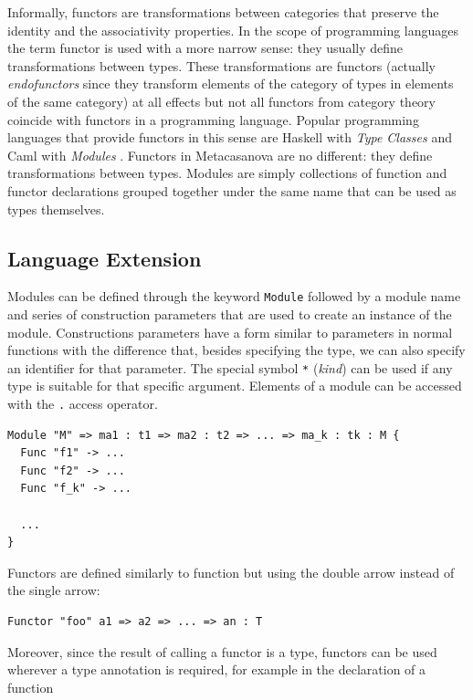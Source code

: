 \noindent
Informally, functors are transformations between categories that preserve the identity and the associativity properties. In the scope of programming languages the term functor is used with a more narrow sense: they usually define transformations between types. These transformations are functors (actually \textit{endofunctors} since they transform elements of the category of types in elements of the same category) at all effects but not all functors from category theory coincide with functors in a programming language. Popular programming languages that provide functors in this sense are Haskell with \textit{Type Classes} \cite{jones1995functional, kiselyov2004strongly, mcbride2002faking, thompson1999haskell, wadler1989make} and Caml with \textit{Modules} \cite{leroy2000modular, paulson1996ml, wehr2008ml}. Functors in Metacasanova are no different: they define transformations between types. Modules are simply collections of function and functor declarations grouped together under the same name that can be used as types themselves.

\subsection{Language Extension}
\label{subsec:ch_functors_language_extension}
Modules can be defined through the keyword \texttt{Module} followed by a module name and series of construction parameters that are used to create an instance of the module. Constructions parameters have a form similar to parameters in normal functions with the difference that, besides specifying the type, we can also specify an identifier for that parameter. The special symbol \texttt{*} (\textit{kind}) can be used if any type is suitable for that specific argument. Elements of a module can be accessed with the \texttt{.} access operator.

\begin{lstlisting}
Module "M" => ma1 : t1 => ma2 : t2 => ... => ma_k : tk : M {
  Func "f1" -> ...
  Func "f2" -> ...
  Func "f_k" -> ...
  
  ...
} 
\end{lstlisting}

\noindent
Functors are defined similarly to function but using the double arrow instead of the single arrow:

\begin{lstlisting}
Functor "foo" a1 => a2 => ... => an : T
\end{lstlisting}

\noindent
Moreover, since the result of calling a functor is a type, functors can be used wherever a type annotation is required, for example in the declaration of a function

